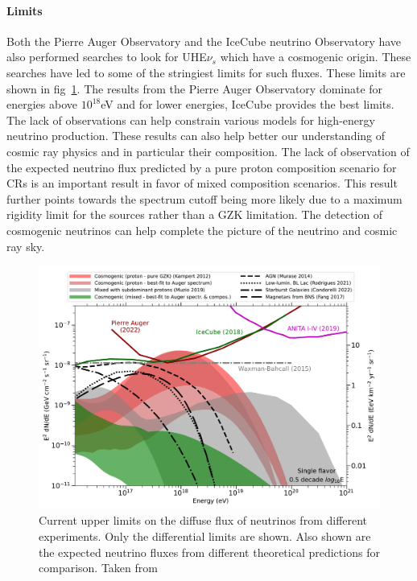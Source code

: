   \paragraph{Limits}
  \label{subsubsec:CosmoNuLimits}
  Both the Pierre Auger Observatory and the IceCube neutrino Observatory have also performed searches to look for UHE$\nu_s$ which have a cosmogenic origin. These searches have led to some of the stringiest limits for such fluxes. These limits are shown in fig~\ref{fig:Nu_limits_auger}. The results from the Pierre Auger Observatory dominate for energies above $10^{18}$eV and for lower energies, IceCube provides the best limits. The lack of observations can help constrain various models for high-energy neutrino production. These results can also help better our understanding of cosmic ray physics and in particular their composition. The lack of observation of the expected neutrino flux predicted by a pure proton composition scenario for CRs is an important result in favor of mixed composition scenarios. This result further points towards the spectrum cutoff being more likely due to a maximum rigidity limit for the sources rather than a GZK limitation. The detection of cosmogenic neutrinos can help complete the picture of the neutrino and cosmic ray sky. 

\begin{figure}[t!]
  \centering
  \includegraphics[width=14.5cm]{thesis_figures/CRnNu/neutrinolimits_icrc2023_wiki.pdf}
  \caption{Current upper limits on the diffuse flux of neutrinos from different experiments. Only the differential limits are shown. Also shown are the expected neutrino fluxes from different theoretical predictions for comparison. Taken from~\cite{PierreAuger:2023pjg}}
  \label{fig:Nu_limits_auger}
\end{figure}

